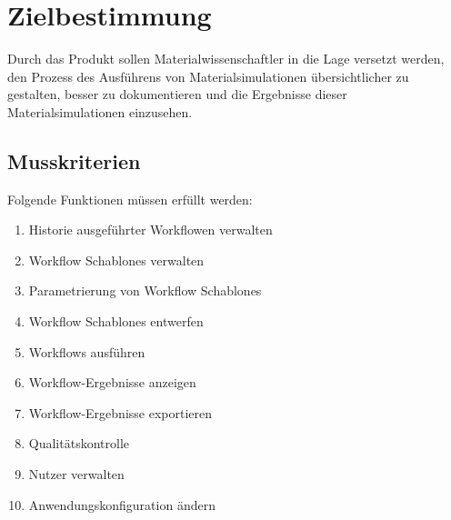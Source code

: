 \chapter{Zielbestimmung}
Durch das Produkt sollen Materialwissenschaftler in die Lage versetzt werden, den Prozess des Ausführens von Materialsimulationen übersichtlicher zu gestalten, besser zu dokumentieren und die Ergebnisse dieser Materialsimulationen einzusehen.
\newline
\section{Musskriterien}
Folgende Funktionen müssen erfüllt werden:
\renewcommand{\labelenumi}{/M\arabic{enumi}0/}
\begin{enumerate}
    \setlength\itemsep{-1em}
    \item Historie ausgeführter \gls{Workflow}en verwalten
    \item \glspl{Workflow Schablone} verwalten
    \item Parametrierung von \glspl{Workflow Schablone}
    \item \glspl{Workflow Schablone} entwerfen %
    \item \glspl{Workflow} ausführen
    \item \gls{Workflow}-Ergebnisse anzeigen
    \item \gls{Workflow}-Ergebnisse exportieren
    \item Qualitätskontrolle
    \item Nutzer verwalten
    \item Anwendungskonfiguration ändern
\end{enumerate}
\newpage
